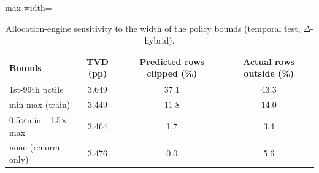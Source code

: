 \begin{table}[H]
\caption{Allocation-engine sensitivity to the width of the policy bounds (temporal test, $\Delta$-hybrid).}\label{tab:bounds}
\centering\footnotesize
\renewcommand{\arraystretch}{1.0}
\begin{adjustbox}{max width=\linewidth}
\begin{tabular}{lccc}
\toprule
Bounds & TVD (pp) & Predicted rows clipped (\%) & Actual rows outside (\%) \\
\midrule
1st-99th pctile & 3.649 & 37.1 & 43.3 \\
min-max (train) & 3.449 & 11.8 & 14.0 \\
0.5$\times$min - 1.5$\times$max & 3.464 & 1.7 & 3.4 \\
none (renorm only) & 3.476 & 0.0 & 5.6 \\
\bottomrule
\end{tabular}\end{adjustbox}
\end{table}
